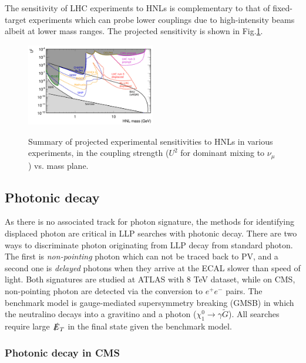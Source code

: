 The sensitivity of LHC experiments to HNLs is complementary to that of fixed-target experiments which can probe lower couplings due to high-intensity beams albeit at lower mass ranges. The projected sensitivity is shown in Fig.\ref{fig:semileptonic}.

\begin{figure}
    \centering
    \caption{Summary of projected experimental sensitivities to HNLs in various experiments, in the coupling strength ($U^2$ for dominant mixing to $\nu_{\mu}$) vs. mass plane.}
    \includegraphics[width=0.5\textwidth]{fig/semileptonic.png}
    \label{fig:semileptonic}
\end{figure}


\subsection{Photonic decay}

As there is no associated track for photon signature, the methods for identifying displaced photon are critical in LLP searches with photonic decay. There are two ways to discriminate photon originating from LLP decay from standard photon. The first is \textit{non-pointing} photon which can not be traced back to PV, and a second one is \textit{delayed} photons when they arrive at the ECAL slower than speed of light. Both signatures are studied at ATLAS with 8 TeV dataset, while on CMS, non-pointing photon are detected via the conversion to $e^+e^-$ pairs. The benchmark model is gauge-mediated supersymmetry breaking (GMSB) in which the neutralino decays into a gravitino and a photon ($\chi^{0}_1 \rightarrow \gamma \tilde{G}$). All searches require large $\slashed{E}_T$ in the final state given the benchmark model. 

\subsubsection{Photonic decay in CMS}

